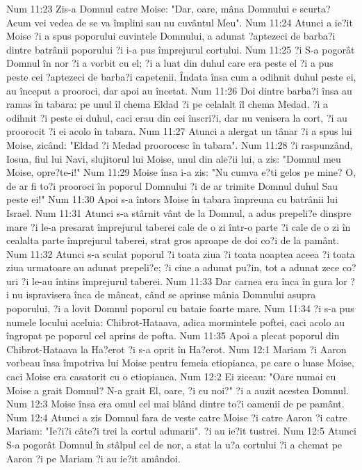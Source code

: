 Num 11:23  Zis-a Domnul catre Moise: "Dar, oare, mâna Domnului e scurta? Acum vei vedea de se va împlini sau nu cuvântul Meu".
Num 11:24  Atunci a ie?it Moise ?i a spus poporului cuvintele Domnului, a adunat ?aptezeci de barba?i dintre batrânii poporului ?i i-a pus împrejurul cortului.
Num 11:25  ?i S-a pogorât Domnul în nor ?i a vorbit cu el; ?i a luat din duhul care era peste el ?i a pus peste cei ?aptezeci de barba?i capetenii. Îndata însa cum a odihnit duhul peste ei, au început a prooroci, dar apoi au încetat.
Num 11:26  Doi dintre barba?i însa au ramas în tabara: pe unul îl chema Eldad ?i pe celalalt îl chema Medad. ?i a odihnit ?i peste ei duhul, caci erau din cei înscri?i, dar nu venisera la cort, ?i au proorocit ?i ei acolo în tabara.
Num 11:27  Atunci a alergat un tânar ?i a spus lui Moise, zicând: "Eldad ?i Medad proorocesc în tabara".
Num 11:28  ?i raspunzând, Iosua, fiul lui Navi, slujitorul lui Moise, unul din ale?ii lui, a zis: "Domnul meu Moise, opre?te-i!"
Num 11:29  Moise însa i-a zis: "Nu cumva e?ti gelos pe mine? O, de ar fi to?i prooroci în poporul Domnului ?i de ar trimite Domnul duhul Sau peste ei!"
Num 11:30  Apoi s-a întors Moise în tabara împreuna cu batrânii lui Israel.
Num 11:31  Atunci s-a stârnit vânt de la Domnul, a adus prepeli?e dinspre mare ?i le-a presarat împrejurul taberei cale de o zi într-o parte ?i cale de o zi în cealalta parte împrejurul taberei, strat gros aproape de doi co?i de la pamânt.
Num 11:32  Atunci s-a sculat poporul ?i toata ziua ?i toata noaptea aceea ?i toata ziua urmatoare au adunat prepeli?e; ?i cine a adunat pu?in, tot a adunat zece co?uri ?i le-au întins împrejurul taberei.
Num 11:33  Dar carnea era înca în gura lor ?i nu ispravisera înca de mâncat, când se aprinse mânia Domnului asupra poporului, ?i a lovit Domnul poporul cu bataie foarte mare.
Num 11:34  ?i s-a pus numele locului aceluia: Chibrot-Hataava, adica mormintele poftei, caci acolo au îngropat pe poporul cel aprins de pofta.
Num 11:35  Apoi a plecat poporul din Chibrot-Hataava la Ha?erot ?i s-a oprit în Ha?erot.
Num 12:1  Mariam ?i Aaron vorbeau însa împotriva lui Moise pentru femeia etiopianca, pe care o luase Moise, caci Moise era casatorit cu o etiopianca.
Num 12:2  Ei ziceau: "Oare numai cu Moise a grait Domnul? N-a grait El, oare, ?i cu noi?" ?i a auzit acestea Domnul.
Num 12:3  Moise însa era omul cel mai blând dintre to?i oamenii de pe pamânt.
Num 12:4  Atunci a zis Domnul fara de veste catre Moise ?i catre Aaron ?i catre Mariam: "Ie?i?i câte?i trei la cortul adunarii". ?i au ie?it tustrei.
Num 12:5  Atunci S-a pogorât Domnul în stâlpul cel de nor, a stat la u?a cortului ?i a chemat pe Aaron ?i pe Mariam ?i au ie?it amândoi.
